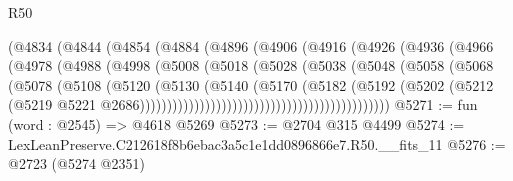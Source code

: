 \begin{lexlean}{R50}
\begin{coremodule}
                                  (@4834
                                    (@4844
                                      (@4854
                                        (@4884
                                          (@4896
                                            (@4906
                                              (@4916
                                                (@4926
                                                  (@4936
                                                    (@4966
                                                      (@4978
                                                        (@4988
                                                          (@4998
                                                            (@5008
                                                              (@5018
                                                                (@5028
                                                                  (@5038
                                                                    (@5048
                                                                      (@5058
                                                                        (@5068
                                                                          (@5078
                                                                            (@5108
                                                                              (@5120
                                                                                (@5130
                                                                                  (@5140
                                                                                    (@5170
                                                                                      (@5182
                                                                                        (@5192
                                                                                          (@5202
                                                                                            (@5212
                                                                                              (@5219
                                                                                                @5221
                                                                                                @2686))))))))))))))))))))))))))))))))))))))))))))))
@5271 := fun (word : @2545) => @4618 @5269
@5273 := @2704 @315 @4499
@5274 := LexLeanPreserve.C212618f8b6ebac3a5c1e1dd0896866e7.R50.__fits_11
@5276 := @2723 (@5274 @2351)

\end{coremodule}
\end{lexlean}
